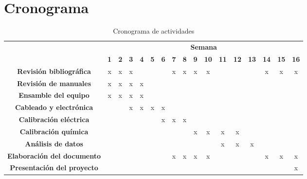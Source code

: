 \section{Cronograma}
	\begin{table}[h]
		\centering
		\caption{Cronograma de actividades}
		\label{tb: cronograma}
		\footnotesize
		\begin{tabular}{|c|c|c|c|c|c|c|c|c|c|c|c|c|c|c|c|c|}
			\hline
			\rowcolor[HTML]{C0C0C0} 
			\cellcolor[HTML]{C0C0C0}                                       & \multicolumn{16}{c|}{\cellcolor[HTML]{C0C0C0}\textbf{Semana}} \\ \cline{2-17} 
			\rowcolor[HTML]{EFEFEF} 
			\multirow{-2}{*}{\cellcolor[HTML]{C0C0C0}\textbf{Actividades}} & \textbf{1} & \textbf{2} & \textbf{3} & \textbf{4} & \textbf{5} & \textbf{6} & \textbf{7} & \textbf{8} & \textbf{9} & \textbf{10} & \textbf{11} & \textbf{12} & \textbf{13} & \textbf{14} & \textbf{15} & \textbf{16} \\ \hline
			\cellcolor[HTML]{EFEFEF}
			\textbf{Revisión bibliográfica} & x & x & x & & & & x & x & x & x & & & & x & x & x \\ \hline
			\cellcolor[HTML]{EFEFEF}\textbf{Revisión de manuales} & x & x & x & x & & & & & & & & & & & & \\ \hline
			\cellcolor[HTML]{EFEFEF}\textbf{Ensamble del equipo} & x & x & x & x & & & & & & & & & & & & \\ \hline
			\cellcolor[HTML]{EFEFEF}\textbf{Cableado y electrónica} & & & x & x & x & x & & & & & & & & & & \\ \hline
			\cellcolor[HTML]{EFEFEF}\textbf{Calibración eléctrica} & & & & & & x & x & x & & & & & & & & \\ \hline
			\cellcolor[HTML]{EFEFEF}\textbf{Calibración química} & & & & & & & & & x & x & x & x & & & & \\ \hline
			\cellcolor[HTML]{EFEFEF}\textbf{Análisis de datos} & & & & & & & & & & & x & x & x & & & \\ \hline
			\cellcolor[HTML]{EFEFEF}\textbf{Elaboración del documento} & & & & & & & x & x & x & x & & & & x & x & x \\ \hline
			\cellcolor[HTML]{EFEFEF}\textbf{Presentación del proyecto} & & & & & & & & & & & & & & & & x \\ \hline
		\end{tabular}
	\end{table}
